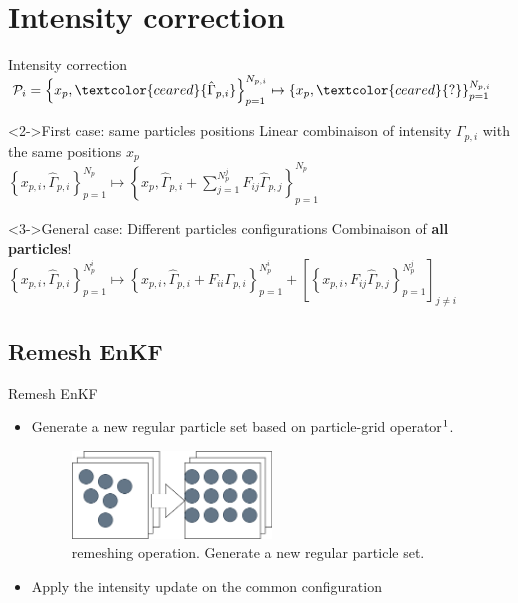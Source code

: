 \documentclass[aspectratio=169]{beamer} %
\begin{document}
\section{Intensity correction}
\begin{frame}{Intensity correction}
    \centering
    $\mathcal{P}_i = \left\{x_p, \textcolor{ceared}{\hat \Gamma_{p, i}}\right\}_{p=1}^{N_{p,i}} \mapsto \left\{x_p, \textcolor{ceared}{?} \right\}_{p=1}^{N_{p,i}}$

    \begin{block}<2->{First case: same particles positions}
        Linear combinaison of intensity $\Gamma_{p,i}$ with the same positions $x_p$\\
        $\left\{x_{p,i}, \hat \Gamma_{p,i}\right\}_{p=1}^{N_p} \mapsto \left\{x_p, \hat \Gamma_{p, i} + \sum_{j=1}^{N_p^j} F_{ij} \hat \Gamma_{p,j} \right\}_{p=1}^{N_p}$
    \end{block}

    \begin{block}<3->{General case: Different particles configurations}
        Combinaison of \textbf{all particles}! \\
        $ \left\{x_{p,i}, \hat \Gamma_{p,i}\right\}_{p=1}^{N^i_p} \mapsto \left\{x_{p,i}, \hat \Gamma_{p,i} + F_{ii}\Gamma_{p,i} \right\}_{p=1}^{N_p^i} + \left[\left\{x_{p,i}, F_{ij} \hat \Gamma_{p,j}\right\}_{p=1}^{N_p^j}\right]_{j\neq i}$ \\
    \end{block}
\end{frame}

\subsection{Remesh EnKF}
\begin{frame}{Remesh EnKF}
    \subtitle{Regrid on a common particle configuration}
    \begin{itemize}
        \item Generate a new regular particle set based on particle-grid operator$\footnotemark[1]$.
              \begin{figure}
                  \centering
                  \includegraphics[width=0.5\textwidth]{images/remesh_enkf.png}
                  \caption{remeshing operation. Generate a new regular particle set.}
              \end{figure}
        \item Apply the intensity update on the common configuration
    \end{itemize}

\end{frame}
\end{document}
